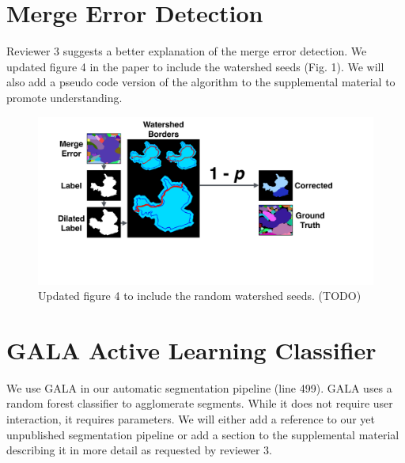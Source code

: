 \documentclass[10pt,twocolumn,letterpaper]{article}
\begin{document}
\section{Merge Error Detection}

Reviewer 3 suggests a better explanation of the merge error detection. We updated figure 4 in the paper to include the watershed seeds (Fig. 1). We will also add a pseudo code version of the algorithm to the supplemental material to promote understanding.

\begin{figure}[h]
\centering
\includegraphics[width=\linewidth]{gfx/merge_error_v4.pdf}
\caption{Updated figure 4 to include the random watershed seeds. (TODO)}
\label{fig:merge_error}
\end{figure}


\section{GALA Active Learning Classifier}

We use GALA in our automatic segmentation pipeline (line 499). GALA uses a random forest classifier to agglomerate segments. While it does not require user interaction, it requires parameters. We will either add a reference to our yet unpublished segmentation pipeline or add a section to the supplemental material describing it in more detail as requested by reviewer 3.

%
%
\end{document}
